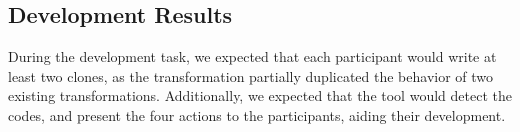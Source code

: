 \documentclass[nocopyrightspace,10pt]{sigplanconf}
\begin{document}

\subsection{Development Results}
During the development task, we expected that each participant would
write at least two clones, as the transformation partially duplicated
the behavior of two existing transformations. Additionally, we
expected that the tool would detect the codes, and present the four
actions to the participants, aiding their development.
\end{document}
